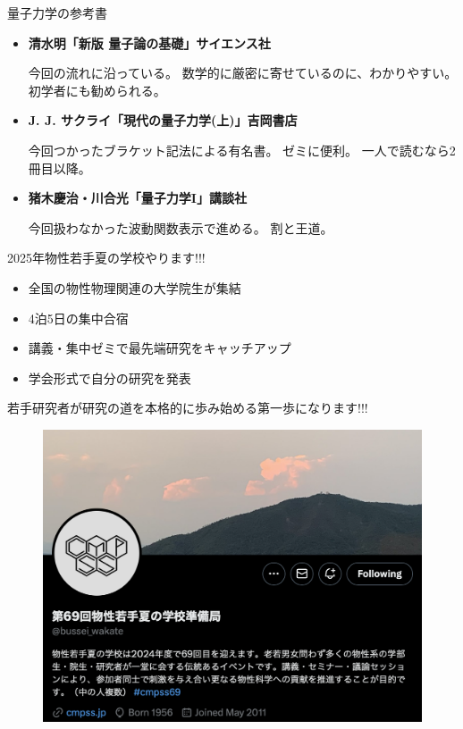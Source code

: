 \documentclass[dvipdfm]{beamer}
\begin{document}
\begin{frame}{量子力学の参考書}
    \begin{itemize}
        \item \textbf{清水明「新版 量子論の基礎」サイエンス社}
        
        今回の流れに沿っている。
        数学的に厳密に寄せているのに、わかりやすい。
        初学者にも勧められる。
        \item \textbf{J. J. サクライ「現代の量子力学(上)」吉岡書店}
        
        今回つかったブラケット記法による有名書。
        ゼミに便利。
        一人で読むなら2冊目以降。
        \item \textbf{猪木慶治・川合光「量子力学I」講談社}

        今回扱わなかった波動関数表示で進める。
        割と王道。
    \end{itemize}
\end{frame}

\begin{frame}{2025年物性若手夏の学校やります!!!}
    \begin{itemize}
        \item 全国の物性物理関連の大学院生が集結
        \item 4泊5日の集中合宿
        \item 講義・集中ゼミで最先端研究をキャッチアップ
        \item 学会形式で自分の研究を発表
    \end{itemize}
    若手研究者が研究の道を本格的に歩み始める第一歩になります!!!
    
    \textbf{}

    \begin{figure}
        \centering
        \includegraphics[width=0.6\linewidth]{bussei-tweet.png}
    \end{figure}
\end{frame}
\end{document}

